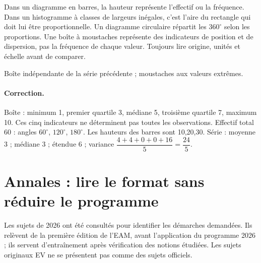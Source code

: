 Dans un diagramme en barres, la hauteur représente l’effectif ou la fréquence. Dans un histogramme à classes de largeurs inégales, c’est l’aire du rectangle qui doit lui être proportionnelle. Un diagramme circulaire répartit les $360^\circ$ selon les proportions. Une boîte à moustaches représente des indicateurs de position et de dispersion, pas la fréquence de chaque valeur. Toujours lire origine, unités et échelle avant de comparer.
\label{STATS-EX}
\begin{center}\par\small Boîte indépendante de la série précédente ; moustaches aux valeurs extrêmes.\end{center}
\ifprof
\paragraph{Correction.} Boîte : minimum 1, premier quartile 3, médiane 5, troisième quartile 7, maximum 10. Ces cinq indicateurs ne déterminent pas toutes les observations. Effectif total 60 : angles $60^\circ$, $120^\circ$, $180^\circ$. Les hauteurs des barres sont 10,20,30. Série : moyenne 3 ; médiane 3 ; étendue 6 ; variance $\dfrac{4+4+0+0+16}{5}=\dfrac{24}{5}$.
\fi

\section{Annales : lire le format sans réduire le programme}\label{ANNALES}
Les sujets de 2026 ont été consultés pour identifier les démarches demandées. Ils relèvent de la première édition de l’EAM, avant l’application du programme 2026 ; ils servent d’entraînement après vérification des notions étudiées. Les sujets originaux EV ne se présentent pas comme des sujets officiels.

